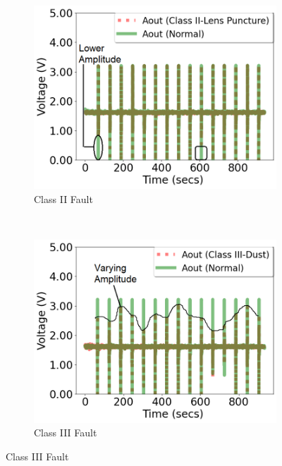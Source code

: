 \documentclass[manuscript,screen,review]{acmart} %
\providecommand{\DIFaddbeginFL}{} %
\providecommand{\DIFaddendFL}{} %
\providecommand{\DIFdelbeginFL}{} %
\providecommand{\DIFdelendFL}{} %
\newcommand{\DIFscaledelfig}{0.5}
\newlength{\DIFdelgraphicswidth} %
\newlength{\DIFdelgraphicsheight} %
\newcommand{\DIFaddincludegraphics}[2][]{{\color{blue}\fbox{\DIFOincludegraphics[#1]{#2}}}} %
\newcommand{\DIFdelincludegraphics}[2][]{%
\sbox{\DIFdelgraphicsbox}{\DIFOincludegraphics[#1]{#2}}%
\settoboxwidth{\DIFdelgraphicswidth}{\DIFdelgraphicsbox} %
\settoboxtotalheight{\DIFdelgraphicsheight}{\DIFdelgraphicsbox} %
\scalebox{\DIFscaledelfig}{%
\parbox[b]{\DIFdelgraphicswidth}{\usebox{\DIFdelgraphicsbox}\\[-\baselineskip] \rule{\DIFdelgraphicswidth}{0em}}\llap{\resizebox{\DIFdelgraphicswidth}{\DIFdelgraphicsheight}{%
\setlength{\unitlength}{\DIFdelgraphicswidth}%
\begin{picture}(1,1)%
\thicklines\linethickness{2pt} %
{\color[rgb]{1,0,0}\put(0,0){\framebox(1,1){}}}%
{\color[rgb]{1,0,0}\put(0,0){\line( 1,1){1}}}%
{\color[rgb]{1,0,0}\put(0,1){\line(1,-1){1}}}%
\end{picture}%
}\hspace*{3pt}}} %
} %
\DeclareRobustCommand{\DIFaddbeginFL}{\DIFOaddbeginFL \let\includegraphics\DIFaddincludegraphics} %
\DeclareRobustCommand{\DIFaddendFL}{\DIFOaddendFL \let\includegraphics\DIFOincludegraphics} %
\DeclareRobustCommand{\DIFdelbeginFL}{\DIFOdelbeginFL \let\includegraphics\DIFdelincludegraphics} %
\DeclareRobustCommand{\DIFdelendFL}{\DIFOaddendFL \let\includegraphics\DIFOincludegraphics} %
\begin{document}
\begin{figure}[b]
\DIFdelendFL \DIFaddbeginFL \begin{subfigure}[t]{0.3\textwidth}
		\DIFaddendFL \centering
		\DIFdelbeginFL %
\DIFdelendFL \DIFaddbeginFL \includegraphics[width=\textwidth]{figures/2-PIR-Fault/normal-classII/classII_compared.png}
		\DIFaddendFL \caption{Class II Fault}
		\label{fig:pir_sensor_controlled_b}
	\end{subfigure}\DIFdelbeginFL %
\DIFdelendFL \DIFaddbeginFL \\\begin{subfigure}[t]{0.3\textwidth}
		\DIFaddendFL \centering
		\DIFdelbeginFL %
\DIFdelendFL \DIFaddbeginFL \includegraphics[width=\textwidth]{figures/2-PIR-Fault/normal-classIII/classIII_compared.png}
		\DIFaddendFL \caption{Class III Fault}
		\label{fig:pir_sensor_controlled_c}
	\end{subfigure}
	\DIFdelbeginFL %


\end{figure}
\end{document}
